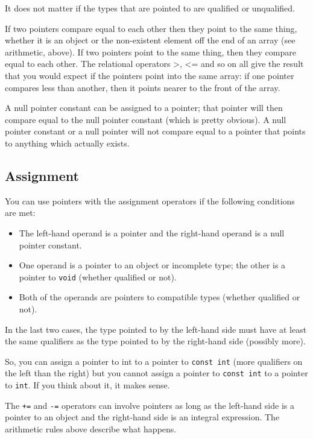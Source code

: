    It does not matter if the types that are pointed to are qualified or
    unqualified.


   If two pointers compare equal to each other then they point to the
    same thing, whether it is an object or the non-existent element off the
    end of an array (see arithmetic, above). If two pointers point to the
    same thing, then they compare equal to each other. The relational
    operators >, <= and so on all give the result that you would
    expect if the pointers point into the same array: if one pointer
    compares less than another, then it points nearer to the front of the
    array.


   A null pointer constant can be assigned to a pointer; that pointer
    will then compare equal to the null pointer constant (which is pretty
    obvious). A null pointer constant or a null pointer will not compare
    equal to a pointer that points to anything which actually exists.


  

  \subsection{Assignment}
   

   You can use pointers with the assignment operators if the following
    conditions are met:


   \begin{itemize}
    \item The left-hand operand is a pointer and the right-hand operand is a
     null pointer constant.
    \item One operand is a pointer to an object or incomplete type; the other
     is a pointer to \texttt{void} (whether qualified or not).
    \item Both of the operands are pointers to compatible types (whether
     qualified or not).
   \end{itemize}

   In the last two cases, the type pointed to by the left-hand side must
    have at least the same qualifiers as the type pointed to by the
    right-hand side (possibly more).


   So, you can assign a pointer to int to a pointer to \texttt{const
    int} (more qualifiers on the left than the right) but you cannot
    assign a pointer to \texttt{const int} to a pointer to
    \texttt{int}. If you think about it, it makes sense.


   The \texttt{+=} and \texttt{-=} operators can involve pointers
    as long as the left-hand side is a pointer to an object and the
    right-hand side is an integral expression. The arithmetic rules above
    describe what happens.


